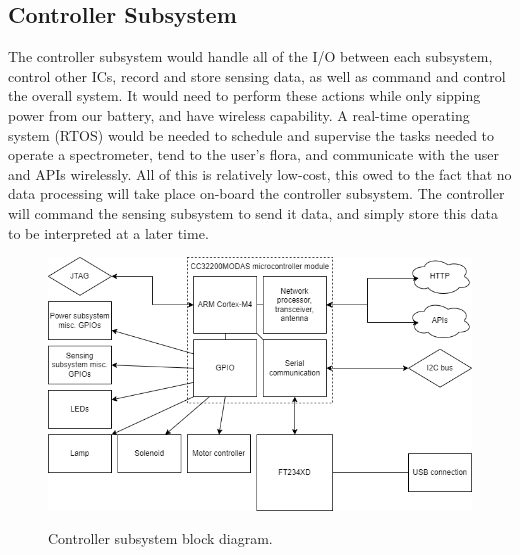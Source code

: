 \documentclass[journal]{IEEEtran}
\begin{document}
\subsection{Controller Subsystem}
The controller subsystem would handle all of the I/O between each subsystem, control other ICs, record and store sensing data, as well as command and control the overall system. It would need to perform these actions while only sipping power from our battery, and have wireless capability. A real-time operating system (RTOS) would be needed to schedule and supervise the tasks needed to operate a spectrometer, tend to the user's flora, and communicate with the user and APIs wirelessly. All of this is relatively low-cost, this owed to the fact that no data processing will take place on-board the controller subsystem. The controller will command the sensing subsystem to send it data, and simply store this data to be interpreted at a later time.

\begin{figure}[H]
   \centering
   \includegraphics[width=\linewidth]{images/control-block-diagram.png}
   \label{fig:control-block-diagram}
   \caption{Controller subsystem block diagram.}
\end{figure}
\end{document}
